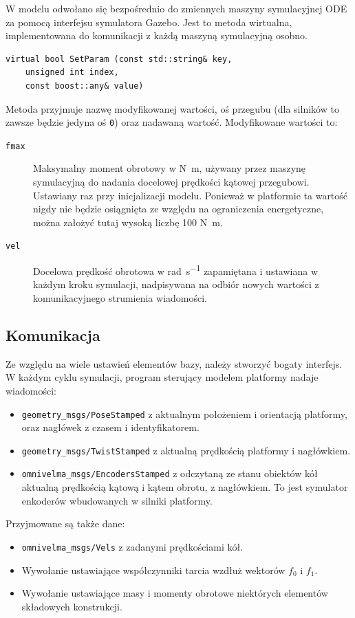 		W modelu odwołano się bezpośrednio do zmiennych maszyny symulacyjnej ODE za pomocą interfejsu symulatora Gazebo.
		Jest to metoda wirtualna, implementowana do komunikacji z każdą maszyną symulacyjną osobno.
		\begin{verbatim}
virtual bool SetParam (const std::string& key,
	unsigned int index,
	const boost::any& value)
		\end{verbatim}
		Metoda przyjmuje nazwę modyfikowanej wartości, oś przegubu (dla silników to zawsze będzie jedyna oś \texttt{0}) oraz nadawaną wartość.
		Modyfikowane wartości to:
		\begin{description}
			\item[\texttt{fmax}] Maksymalny moment obrotowy w \si{\newton\metre}, używany przez maszynę symulacyjną do nadania docelowej prędkości kątowej przegubowi. Ustawiany raz przy inicjalizacji modelu. Ponieważ w platformie ta wartość nigdy nie będzie osiągnięta ze względu na ograniczenia energetyczne, można założyć tutaj wysoką liczbę 100 \si{\newton\metre}.
			\item[\texttt{vel}] Docelowa prędkość obrotowa w \si{\radian\per\second} zapamiętana i ustawiana w każdym kroku symulacji, nadpisywana na odbiór nowych wartości z komunikacyjnego strumienia wiadomości.
		\end{description}
	
	\subsection{Komunikacja}
		Ze względu na wiele ustawień elementów bazy, należy stworzyć bogaty interfejs.
		W każdym cyklu symulacji, program sterujący modelem platformy nadaje wiadomości:
		\begin{itemize}
		\item \texttt{geometry\_msgs/PoseStamped} z aktualnym położeniem i orientacją platformy, oraz nagłówek z czasem i identyfikatorem.
		\item \texttt{geometry\_msgs/TwistStamped} z aktualną prędkością platformy i nagłówkiem.
		\item \texttt{omnivelma\_msgs/EncodersStamped} z odczytaną ze stanu obiektów kół aktualną prędkością kątową i kątem obrotu, z nagłówkiem. 
		To jest symulator enkoderów wbudowanych w silniki platformy.
		\end{itemize}
		
		Przyjmowane są także dane:
		\begin{itemize}
		\item \texttt{omnivelma\_msgs/Vels} z zadanymi prędkościami kół.
		\item Wywołanie ustawiające współczynniki tarcia wzdłuż wektorów $f_0$ i $f_1$.
		\item Wywołanie ustawiające masy i momenty obrotowe niektórych elementów składowych konstrukcji.
		\end{itemize}

